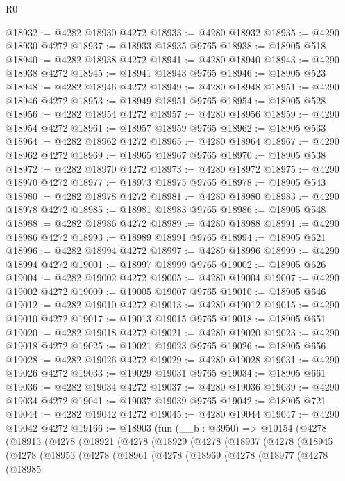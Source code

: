 \begin{lexlean}{R0}
\begin{coremodule}
@18932 := @4282 @18930 @4272
@18933 := @4280 @18932
@18935 := @4290 @18930 @4272
@18937 := @18933 @18935 @9765
@18938 := @18905 @518
@18940 := @4282 @18938 @4272
@18941 := @4280 @18940
@18943 := @4290 @18938 @4272
@18945 := @18941 @18943 @9765
@18946 := @18905 @523
@18948 := @4282 @18946 @4272
@18949 := @4280 @18948
@18951 := @4290 @18946 @4272
@18953 := @18949 @18951 @9765
@18954 := @18905 @528
@18956 := @4282 @18954 @4272
@18957 := @4280 @18956
@18959 := @4290 @18954 @4272
@18961 := @18957 @18959 @9765
@18962 := @18905 @533
@18964 := @4282 @18962 @4272
@18965 := @4280 @18964
@18967 := @4290 @18962 @4272
@18969 := @18965 @18967 @9765
@18970 := @18905 @538
@18972 := @4282 @18970 @4272
@18973 := @4280 @18972
@18975 := @4290 @18970 @4272
@18977 := @18973 @18975 @9765
@18978 := @18905 @543
@18980 := @4282 @18978 @4272
@18981 := @4280 @18980
@18983 := @4290 @18978 @4272
@18985 := @18981 @18983 @9765
@18986 := @18905 @548
@18988 := @4282 @18986 @4272
@18989 := @4280 @18988
@18991 := @4290 @18986 @4272
@18993 := @18989 @18991 @9765
@18994 := @18905 @621
@18996 := @4282 @18994 @4272
@18997 := @4280 @18996
@18999 := @4290 @18994 @4272
@19001 := @18997 @18999 @9765
@19002 := @18905 @626
@19004 := @4282 @19002 @4272
@19005 := @4280 @19004
@19007 := @4290 @19002 @4272
@19009 := @19005 @19007 @9765
@19010 := @18905 @646
@19012 := @4282 @19010 @4272
@19013 := @4280 @19012
@19015 := @4290 @19010 @4272
@19017 := @19013 @19015 @9765
@19018 := @18905 @651
@19020 := @4282 @19018 @4272
@19021 := @4280 @19020
@19023 := @4290 @19018 @4272
@19025 := @19021 @19023 @9765
@19026 := @18905 @656
@19028 := @4282 @19026 @4272
@19029 := @4280 @19028
@19031 := @4290 @19026 @4272
@19033 := @19029 @19031 @9765
@19034 := @18905 @661
@19036 := @4282 @19034 @4272
@19037 := @4280 @19036
@19039 := @4290 @19034 @4272
@19041 := @19037 @19039 @9765
@19042 := @18905 @721
@19044 := @4282 @19042 @4272
@19045 := @4280 @19044
@19047 := @4290 @19042 @4272
@19166 := @18903
    (fun (__b : @3950) =>
    @10154
      (@4278
        (@18913
          (@4278
            (@18921
              (@4278
                (@18929
                  (@4278
                    (@18937
                      (@4278
                        (@18945
                          (@4278
                            (@18953
                              (@4278
                                (@18961
                                  (@4278
                                    (@18969
                                      (@4278
                                        (@18977
                                          (@4278
                                            (@18985

\end{coremodule}
\end{lexlean}
